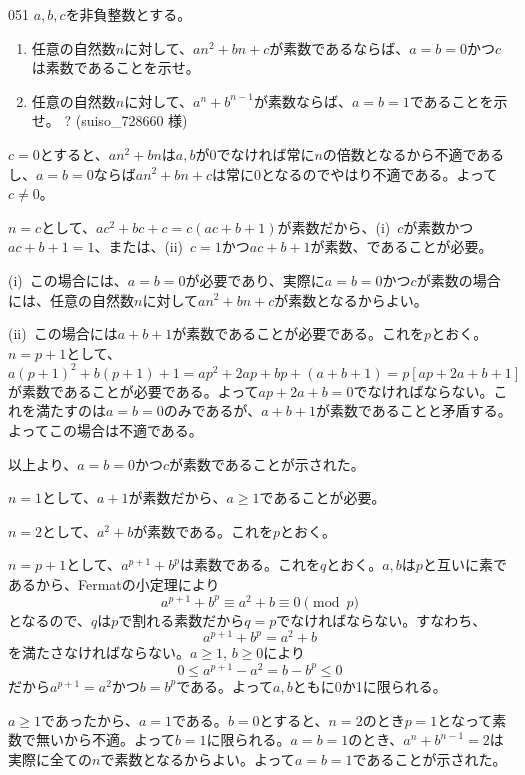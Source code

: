 \begin{prob}{051}{}{}
 $a, b, c$を非負整数とする。
 \begin{enumerate}
  \item 任意の自然数$n$に対して、$an^2+bn+c$が素数であるならば、$a=b=0$かつ$c$は素数であることを示せ。 
  \item 任意の自然数$n$に対して、$a^n+b^{n-1}$が素数ならば、$a=b=1$であることを示せ。 \hosi ? (suiso\_728660 様)
 \end{enumerate}
\end{prob}
$c=0$とすると、$an^2+bn$は$a, b$が0でなければ常に$n$の倍数となるから不適であるし、$a=b=0$ならば$an^2+bn+c$は常に0となるのでやはり不適である。よって$c\neq 0$。

$n=c$として、$ac^2+bc+c=c(ac+b+1)$が素数だから、(i)~$c$が素数かつ$ac+b+1=1$、または、(ii)~$c=1$かつ$ac+b+1$が素数、であることが必要。

(i)~この場合には、$a=b=0$が必要であり、実際に$a=b=0$かつ$c$が素数の場合には、任意の自然数$n$に対して$an^2+bn+c$が素数となるからよい。

(ii)~この場合には$a+b+1$が素数であることが必要である。これを$p$とおく。$n=p+1$として、
\[ a(p+1)^2+b(p+1)+1=ap^2+2ap+bp+(a+b+1)=p\left[ap+2a+b+1\right] \]
が素数であることが必要である。よって$ap+2a+b=0$でなければならない。これを満たすのは$a=b=0$のみであるが、$a+b+1$が素数であることと矛盾する。よってこの場合は不適である。

以上より、$a=b=0$かつ$c$が素数であることが示された。

$n=1$として、$a+1$が素数だから、$a\ge 1$であることが必要。

$n=2$として、$a^2+b$が素数である。これを$p$とおく。

$n=p+1$として、$a^{p+1}+b^p$は素数である。これを$q$とおく。$a, b$は$p$と互いに素であるから、Fermatの小定理により
\[ a^{p+1}+b^p\equiv a^2+b\equiv 0 \pmod{p} \]
となるので、$q$は$p$で割れる素数だから$q=p$でなければならない。すなわち、
\[ a^{p+1}+b^p=a^2+b \]
を満たさなければならない。$a\ge 1$, $b\ge 0$により
\[ 0\le a^{p+1}-a^2=b-b^p\le 0 \]
だから$a^{p+1}=a^2$かつ$b=b^p$である。よって$a, b$ともに0か1に限られる。

$a\ge 1$であったから、$a=1$である。$b=0$とすると、$n=2$のとき$p=1$となって素数で無いから不適。よって$b=1$に限られる。$a=b=1$のとき、$a^n+b^{n-1}=2$は実際に全ての$n$で素数となるからよい。よって$a=b=1$であることが示された。
